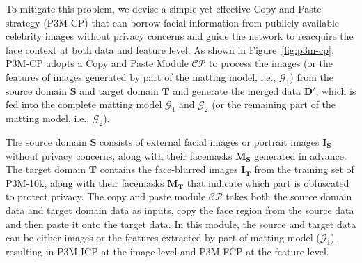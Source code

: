 \documentclass[twocolumn]{svjour3}
\begin{document}
To mitigate this problem, we devise a simple yet effective Copy and Paste strategy (P3M-CP) that can borrow facial information from publicly available celebrity images without privacy concerns and guide the network to reacquire the face context at both data and feature level. As shown in Figure~\ref{fig:p3m-cp}, P3M-CP adopts a Copy and Paste Module $\mathcal{CP}$ to process the images (or the features of images generated by part of the matting model, i.e., $\mathcal{G}_1$) from the source domain $\mathbf{S}$ and target domain $\mathbf{T}$ and generate the merged data $\mathbf{D'}$, which is fed into the complete matting model $\mathcal{G}_1$ and $\mathcal{G}_2$ (or the remaining part of the matting model, i.e., $\mathcal{G}_2$).

The source domain $\mathbf{S}$ consists of external facial images or portrait images $\mathbf{I_S}$ without privacy concerns, along with their facemasks $\mathbf{M_S}$ generated in advance. The target domain $\mathbf{T}$ contains the face-blurred images $\mathbf{I_T}$ from the training set of P3M-10k, along with their facemasks $\mathbf{M_T}$ that indicate which part is obfuscated to protect privacy. The copy and paste module $\mathcal{CP}$ takes both the source domain data and target domain data as inputs, copy the face region from the source data and then paste it onto the target data. In this module, the source and target data can be either images or the features extracted by part of matting model ($\mathcal{G}_1$), resulting in P3M-ICP at the image level and P3M-FCP at the feature level.
\end{document}
